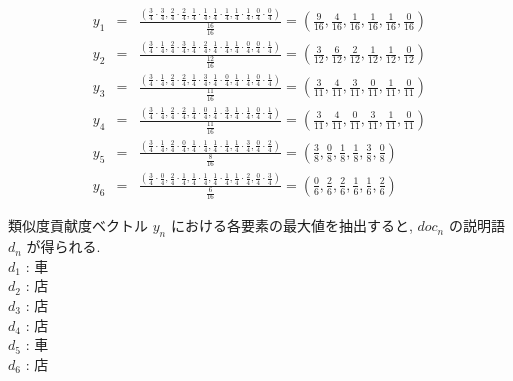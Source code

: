 \documentclass[a4paper,12pt]{jsreport}
\begin{document}
\begin{eqnarray}
y_1 &=& \frac{
\left( 
\frac{3}{4} \cdot \frac{3}{4}, 
\frac{2}{4} \cdot \frac{2}{4}, 
\frac{1}{4} \cdot \frac{1}{4}, 
\frac{1}{4} \cdot \frac{1}{4}, 
\frac{1}{4} \cdot \frac{1}{4}, 
\frac{0}{4} \cdot \frac{0}{4} 
\right)
}{\frac{16}{16}} 
= \left( \frac{9}{16}, \frac{4}{16}, \frac{1}{16}, \frac{1}{16}, \frac{1}{16}, \frac{0}{16} \right)\\
y_2 &=& \frac{
\left( 
\frac{3}{4} \cdot \frac{1}{4}, 
\frac{2}{4} \cdot \frac{3}{4}, 
\frac{1}{4} \cdot \frac{2}{4}, 
\frac{1}{4} \cdot \frac{1}{4}, 
\frac{1}{4} \cdot \frac{0}{4}, 
\frac{0}{4} \cdot \frac{1}{4} 
\right)
}{\frac{12}{16}} 
= \left( \frac{3}{12}, \frac{6}{12}, \frac{2}{12}, \frac{1}{12}, \frac{1}{12}, \frac{0}{12} \right)\\
y_3 &=& \frac{
\left( 
\frac{3}{4} \cdot \frac{1}{4}, 
\frac{2}{4} \cdot \frac{2}{4}, 
\frac{1}{4} \cdot \frac{3}{4}, 
\frac{1}{4} \cdot \frac{0}{4}, 
\frac{1}{4} \cdot \frac{1}{4}, 
\frac{0}{4} \cdot \frac{1}{4} 
\right)
}{\frac{11}{16}} 
= \left( \frac{3}{11}, \frac{4}{11}, \frac{3}{11}, \frac{0}{11}, \frac{1}{11}, \frac{0}{11} \right)\\
y_4 &=& \frac{
\left( 
\frac{3}{4} \cdot \frac{1}{4}, 
\frac{2}{4} \cdot \frac{2}{4}, 
\frac{1}{4} \cdot \frac{0}{4}, 
\frac{1}{4} \cdot \frac{3}{4}, 
\frac{1}{4} \cdot \frac{1}{4}, 
\frac{0}{4} \cdot \frac{1}{4} 
\right)
}{\frac{11}{16}} 
= \left( \frac{3}{11}, \frac{4}{11}, \frac{0}{11}, \frac{3}{11}, \frac{1}{11}, \frac{0}{11} \right)\\
y_5 &=& \frac{
\left( 
\frac{3}{4} \cdot \frac{1}{4}, 
\frac{2}{4} \cdot \frac{0}{4}, 
\frac{1}{4} \cdot \frac{1}{4}, 
\frac{1}{4} \cdot \frac{1}{4}, 
\frac{1}{4} \cdot \frac{3}{4}, 
\frac{0}{4} \cdot \frac{2}{4} 
\right)
}{\frac{8}{16}} 
= \left( \frac{3}{8}, \frac{0}{8}, \frac{1}{8}, \frac{1}{8}, \frac{3}{8}, \frac{0}{8} \right)\\
y_6 &=& \frac{
\left( 
\frac{3}{4} \cdot \frac{0}{4}, 
\frac{2}{4} \cdot \frac{1}{4}, 
\frac{1}{4} \cdot \frac{1}{4}, 
\frac{1}{4} \cdot \frac{1}{4}, 
\frac{1}{4} \cdot \frac{2}{4}, 
\frac{0}{4} \cdot \frac{3}{4} 
\right)
}{\frac{6}{16}} 
= \left( \frac{0}{6}, \frac{2}{6}, \frac{2}{6}, \frac{1}{6}, \frac{1}{6}, \frac{2}{6} \right)
\label{sc3-8}
\end{eqnarray}

類似度貢献度ベクトル $y_n$ における各要素の最大値を抽出すると, 
$doc_n$ の説明語 $d_n$ が得られる.\\
$d_1$ : 車\\
$d_2$ : 店\\
$d_3$ : 店\\
$d_4$ : 店\\
$d_5$ : 車\\
$d_6$ : 店
\end{document}
